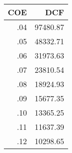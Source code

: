 \documentclass[11pt]{article}
\begin{document}
\begin{tabular}{rr}
COE & DCF \footnotemark\\
\hline
.04 & 97480.87\\
.05 & 48332.71\\
.06 & 31973.63\\
.07 & 23810.54\\
.08 & 18924.93\\
.09 & 15677.35\\
.10 & 13365.25\\
.11 & 11637.39\\
.12 & 10298.65\\
\end{tabular}
\end{document}
